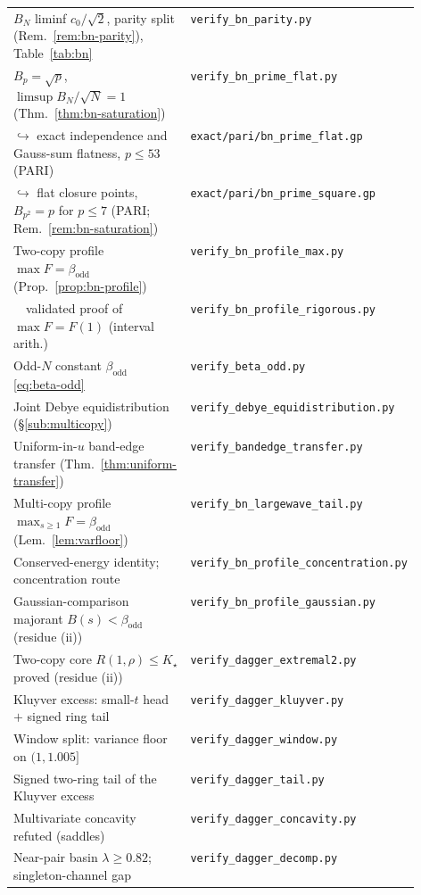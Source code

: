 \begin{longtable}{@{}p{0.53\linewidth}@{\hspace{0.6em}}l@{}}
$B_N$ liminf $c_0/\sqrt2$, parity split (Rem.~\ref{rem:bn-parity}), Table~\ref{tab:bn} & \texttt{verify\_bn\_parity.py}\\
$B_p=\sqrt p$, $\limsup B_N/\sqrt N=1$ (Thm.~\ref{thm:bn-saturation}) & \texttt{verify\_bn\_prime\_flat.py}\\
\quad$\hookrightarrow$ exact independence and Gauss-sum flatness, $p\le53$ (PARI) & \texttt{exact/pari/bn\_prime\_flat.gp}\\
\quad$\hookrightarrow$ flat closure points, $B_{p^2}=p$ for $p\le7$ (PARI; Rem.~\ref{rem:bn-saturation}) & \texttt{exact/pari/bn\_prime\_square.gp}\\
Two-copy profile $\max F=\beta_{\mathrm{odd}}$ (Prop.~\ref{prop:bn-profile}) & \texttt{verify\_bn\_profile\_max.py}\\
$\quad$validated proof of $\max F=F(1)$ (interval arith.) & \texttt{verify\_bn\_profile\_rigorous.py}\\
Odd-$N$ constant $\beta_{\mathrm{odd}}$ \eqref{eq:beta-odd} & \texttt{verify\_beta\_odd.py}\\
Joint Debye equidistribution (\S\ref{sub:multicopy}) & \texttt{verify\_debye\_equidistribution.py}\\
Uniform-in-$u$ band-edge transfer (Thm.~\ref{thm:uniform-transfer}) & \texttt{verify\_bandedge\_transfer.py}\\
Multi-copy profile $\max_{s\ge1}F=\beta_{\mathrm{odd}}$ (Lem.~\ref{lem:varfloor}) & \texttt{verify\_bn\_largewave\_tail.py}\\
Conserved-energy identity; concentration route & \texttt{verify\_bn\_profile\_concentration.py}\\
Gaussian-comparison majorant $B(s)<\beta_{\mathrm{odd}}$ (residue (ii)) & \texttt{verify\_bn\_profile\_gaussian.py}\\
Two-copy core $R(1,\rho)\le K_\star$ proved (residue (ii)) & \texttt{verify\_dagger\_extremal2.py}\\
Kluyver excess: small-$t$ head $+$ signed ring tail & \texttt{verify\_dagger\_kluyver.py}\\
Window split: variance floor on $(1,1.005]$ & \texttt{verify\_dagger\_window.py}\\
Signed two-ring tail of the Kluyver excess & \texttt{verify\_dagger\_tail.py}\\
Multivariate concavity refuted (saddles) & \texttt{verify\_dagger\_concavity.py}\\
Near-pair basin $\lambda\ge0.82$; singleton-channel gap & \texttt{verify\_dagger\_decomp.py}\\

\end{longtable}
